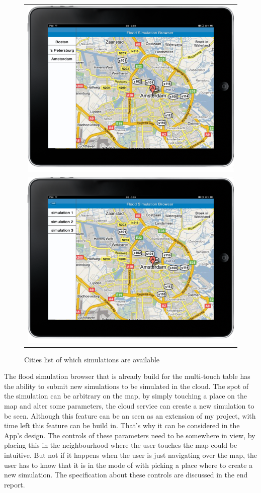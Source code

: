 \begin{figure}[H]
\center
\begin{tabular}{c}
	\includegraphics[scale=0.3]{mockup1_1.png} \\
	\includegraphics[scale=0.3]{mockup2_1.png}
\end{tabular}
\label{fig:mockup}
\caption{Cities list of which simulations are available}
\end{figure}

The flood simulation browser that is already build for the multi-touch table has the ability to submit new simulations to be simulated in the cloud. The spot of the simulation can be arbitrary on the map, by simply touching a place on the map and alter some parameters, the cloud service can create a new simulation to be seen. Although this feature can be an seen as an extension of my project, with time left this feature can be build in. That's why it can be considered in the App's design. The controls of these parameters need to be somewhere in view, by placing this in the neighbourhood where the user touches the map could be intuitive. But not if it happens when the user is just navigating over the map, the user has to know that it is in the mode of with picking a place where to create a new simulation. The specification about these controls are discussed in the end report.

